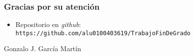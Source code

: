 \begin{frame} [fragile]
  \frametitle{Gracias por su atención}
  \block{\BulletPoint}
    \begin{itemize}
    \item Repositorio en {\it github}: \texttt{https://github.com/alu0100403619/TrabajoFinDeGrado}
    \end{itemize}
    \begin{flushright}
    Gonzalo J. García Martín  \\
    \end{flushright}
  \endblock{}
\end{frame}